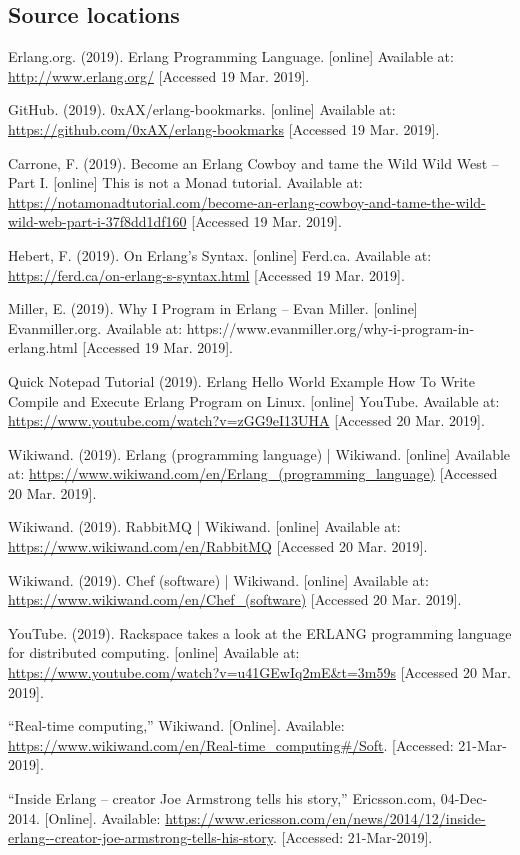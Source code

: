 \documentclass[11 pt]{IEEEtran}
\begin{document}
 \subsection{Source locations}

  
\begin{thebibliography}{99}
Erlang.org. (2019). Erlang Programming Language. [online] Available at: \url{http://www.erlang.org/} [Accessed 19 Mar. 2019].

GitHub. (2019). 0xAX/erlang-bookmarks. [online] Available at: \url{https://github.com/0xAX/erlang-bookmarks} [Accessed 19 Mar. 2019].

Carrone, F. (2019). Become an Erlang Cowboy and tame the Wild Wild West -- Part I. [online] This is not a Monad tutorial. Available at: \url{https://notamonadtutorial.com/become-an-erlang-cowboy-and-tame-the-wild-wild-web-part-i-37f8dd1df160} [Accessed 19 Mar. 2019].

Hebert, F. (2019). On Erlang's Syntax. [online] Ferd.ca. Available at: \url{https://ferd.ca/on-erlang-s-syntax.html} [Accessed 19 Mar. 2019].

Miller, E. (2019). Why I Program in Erlang – Evan Miller. [online] Evanmiller.org. Available at: https://www.evanmiller.org/why-i-program-in-erlang.html [Accessed 19 Mar. 2019].

Quick Notepad Tutorial (2019). Erlang Hello World Example How To Write Compile and Execute Erlang Program on Linux. [online] YouTube. Available at: \url{https://www.youtube.com/watch?v=zGG9eI13UHA} [Accessed 20 Mar. 2019].

Wikiwand. (2019). Erlang (programming language) | Wikiwand. [online] Available at: \url{https://www.wikiwand.com/en/Erlang_(programming_language)} [Accessed 20 Mar. 2019].

Wikiwand. (2019). RabbitMQ | Wikiwand. [online] Available at: \url{https://www.wikiwand.com/en/RabbitMQ} [Accessed 20 Mar. 2019].

Wikiwand. (2019). Chef (software) | Wikiwand. [online] Available at: \url{https://www.wikiwand.com/en/Chef_(software)} [Accessed 20 Mar. 2019].

YouTube. (2019). Rackspace takes a look at the ERLANG programming language for distributed computing. [online] Available at: \url{https://www.youtube.com/watch?v=u41GEwIq2mE&t=3m59s} [Accessed 20 Mar. 2019].

“Real-time computing,” Wikiwand. [Online]. Available: \url{https://www.wikiwand.com/en/Real-time_computing#/Soft}. [Accessed: 21-Mar-2019].

“Inside Erlang – creator Joe Armstrong tells his story,” Ericsson.com, 04-Dec-2014. [Online]. Available: \url{https://www.ericsson.com/en/news/2014/12/inside-erlang--creator-joe-armstrong-tells-his-story}. [Accessed: 21-Mar-2019].

\end{thebibliography}
\end{document}

